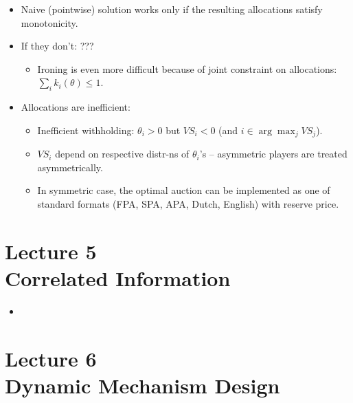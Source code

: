 \documentclass[english,handout]{beamer}		%
\def\lyxframeend{} %
\begin{document}
\begin{itemize}
	\item Naive (pointwise) solution works only if the resulting allocations satisfy monotonicity.
	\item If they don't: ???
	\begin{itemize}
		\item Ironing is even more difficult because of joint constraint on allocations: $\sum_i k_i (\theta) \leq 1$.
	\end{itemize}
	\item Allocations are inefficient:
	\begin{itemize}
		\item Inefficient withholding: $\theta_i > 0$ but $VS_i < 0$ (and $i \in \arg \max_j VS_j$).
		\item $VS_i$ depend on respective distr-ns of $\theta_i$'s -- asymmetric players are treated asymmetrically.
		\item In symmetric case, the optimal auction can be implemented as one of standard formats (FPA, SPA, APA, Dutch, English) with reserve price.
	\end{itemize}
\end{itemize}
\lyxframeend





\section{Lecture 5 \\ Correlated Information}

\begin{itemize}
	\item 
\end{itemize}
\lyxframeend





\section{Lecture 6 \\ Dynamic Mechanism Design}
\end{document}
